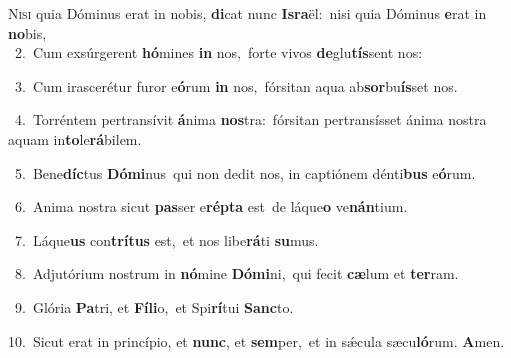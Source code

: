 \lettrine{\initial\textcolor{\initialcolor}{N}}{isi} quia Dóminus erat in nobis, \textbf{di}\-cat nunc \textbf{Is}\-\textbf{ra}ël:~\star nisi quia Dóminus \textbf{e}\-rat in \textbf{no}\-bis,\\
{\numbfont\textcolor{\numbcolor}{~2.}}~Cum exsúrgerent \textbf{hó}\-mines \textbf{in} nos,~\star forte vivos \textbf{de}\-glu\-\textbf{tís}\-sent nos:\par
{\numbfont\textcolor{\numbcolor}{~3.}}~Cum irascerétur furor e\-\textbf{ó}\-rum \textbf{in} nos,~\star fórsitan aqua ab\-\textbf{sor}\-bu\-\textbf{ís}\-set nos.\par
{\numbfont\textcolor{\numbcolor}{~4.}}~Torréntem pertransívit \textbf{á}\-nima \textbf{nos}\-tra:~\star fórsitan pertransísset ánima nostra aquam in\-\textbf{to}\-le\-\textbf{rá}\-bilem.\par
{\numbfont\textcolor{\numbcolor}{~5.}}~Bene\-\textbf{díc}\-tus \textbf{Dó}\-\textbf{mi}nus~\star qui non dedit nos, in captiónem dénti\textbf{bus} e\-\textbf{ó}\-rum.\par
{\numbfont\textcolor{\numbcolor}{~6.}}~Anima nostra sicut \textbf{pas}\-ser e\-\textbf{rép}\-\textbf{ta} est~\star de láque\textbf{o} ve\-\textbf{nán}\-tium.\par
{\numbfont\textcolor{\numbcolor}{~7.}}~Láque\textbf{us} con\-\textbf{trí}\-\textbf{tus} est,~\star et nos libe\-\textbf{rá}\-ti \textbf{su}\-mus.\par
{\numbfont\textcolor{\numbcolor}{~8.}}~Adjutórium nostrum in \textbf{nó}\-mine \textbf{Dó}\-\textbf{mi}ni,~\star qui fecit \textbf{cæ}\-lum et \textbf{ter}\-ram.\par
{\numbfont\textcolor{\numbcolor}{~9.}}~Glória \textbf{Pa}\-tri, et \textbf{Fí}\-\textbf{li}o,~\star et Spi\-\textbf{rí}\-tui \textbf{Sanc}\-to.\par
{\numbfont\textcolor{\numbcolor}{10.}}~Sicut erat in princípio, et \textbf{nunc}\-, et \textbf{sem}\-per,~\star et in sǽcula sæcu\-\textbf{ló}\-rum. \textbf{A}\-men.\par
